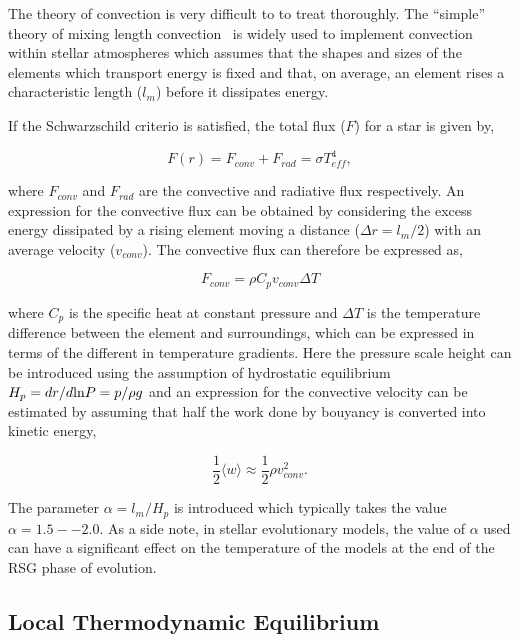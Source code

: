 The theory of convection is very difficult to to treat thoroughly.
The ``simple'' theory of mixing length convection~\cite{1958ZA.....46..108B,1965ApJ...142..841H} is widely used to implement convection within stellar atmospheres which assumes that the shapes and sizes of the elements which transport energy is fixed and that, on average, an element rises a characteristic length ($l_m$) before it dissipates energy.

If the Schwarzschild criterio is satisfied, the total flux ($F$) for a star is given by,

\begin{equation}
    F(r) = F_{conv} + F_{rad} = \sigma T_{eff}^4,\label{eq:flux}
\end{equation}

\noindent where $F_{conv}$ and $F_{rad}$ are the convective and radiative flux respectively.
An expression for the convective flux can be obtained by considering the excess energy dissipated by a rising element moving a distance
($\Delta r = l_m/2$) with an average velocity ($v_{conv}$).
The convective flux can therefore be expressed as,

\begin{equation}
    F_{conv} = \rho C_pv_{conv}\Delta T
\end{equation}

\noindent where $C_p$ is the specific heat at constant pressure and $\Delta T$ is the temperature difference between the element and surroundings, which can be expressed in terms of the different in temperature gradients.
Here the pressure scale height can be introduced using the assumption of hydrostatic equilibrium $H_p = dr / d{\rm ln} P = p/\rho g$ and an expression for the convective velocity can be estimated by assuming that half the work done by bouyancy is converted into kinetic energy,

\begin{equation}
    \frac{1}{2}\langle w\rangle \approx \frac{1}{2}\rho v_{conv}^2.
\end{equation}

The parameter $\alpha = l_m/H_p$ is introduced which typically takes the value $\alpha = 1.5--2.0$.
As a side note, in stellar evolutionary models, the value of $\alpha$ used can have a significant effect on the temperature of the models at the end of the RSG phase of evolution.



\subsection{Local Thermodynamic Equilibrium} %
\label{sub:local_thermodynamic_equilibrium}

